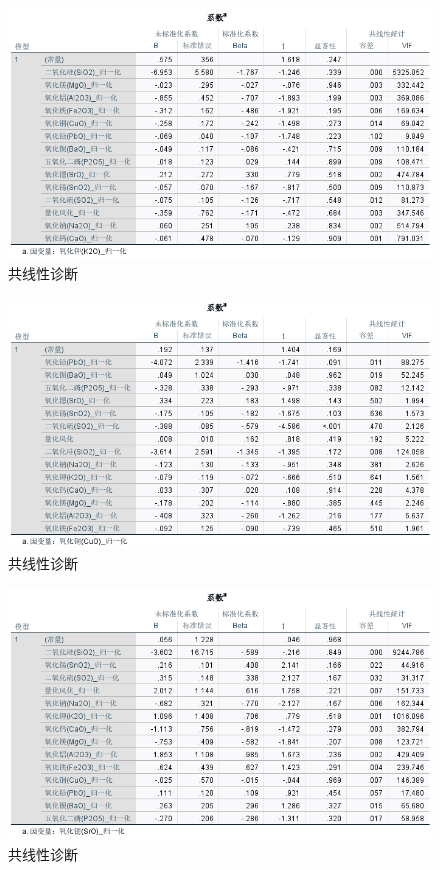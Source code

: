 \documentclass[UTF8]{ctexart}
\begin{document}
\begin{figure}[H]\centering
    \includegraphics[width=1\textwidth,height=0.6\textwidth]{img/1 (3).png} %
    \caption{共线性诊断} %
\end{figure}
\begin{figure}[H]\centering
    \includegraphics[width=1\textwidth,height=0.6\textwidth]{img/1 (4).png} %
    \caption{共线性诊断} %
\end{figure}
\begin{figure}[H]\centering
    \includegraphics[width=1\textwidth,height=0.6\textwidth]{img/1 (5).png} %
    \caption{共线性诊断} %
\end{figure}
\end{document}
